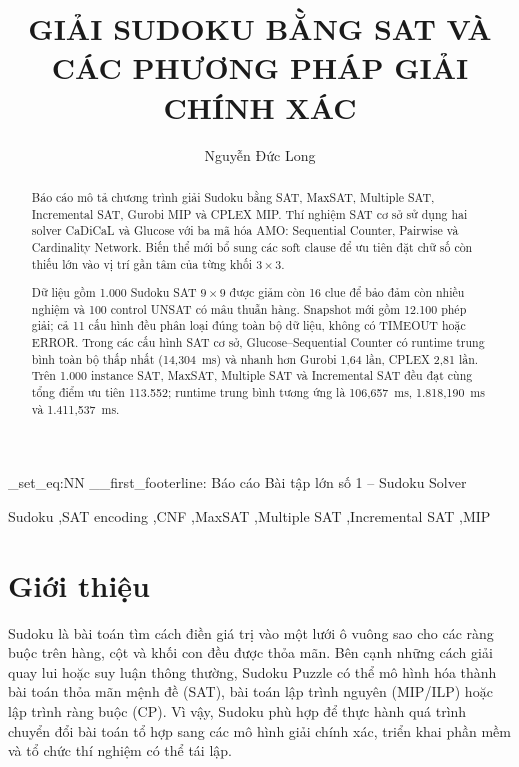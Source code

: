 \documentclass[a4paper,fleqn]{cas-sc}
\begin{document}
\newcommand{\reportfooter}{\small\sffamily Báo cáo Bài tập lớn số 1 -- Sudoku Solver}
\ExplSyntaxOn
\cs_set_eq:NN \__first_footerline: \reportfooter
\ExplSyntaxOff
\RenewDocumentCommand{\printorcid}{}{} %
\title[mode=title]{GIẢI SUDOKU BẰNG SAT VÀ CÁC PHƯƠNG PHÁP GIẢI CHÍNH XÁC}
\tnotemark[1]
\author[1]{Nguyễn Đức Long}
\address[1]{Lớp: INT3011E 4 \quad -- \quad Mã sinh viên: 24021555 }

\begin{abstract}
Báo cáo mô tả chương trình giải Sudoku bằng SAT, MaxSAT, Multiple SAT, Incremental SAT, Gurobi MIP và CPLEX MIP. Thí nghiệm SAT cơ sở sử dụng hai solver CaDiCaL và Glucose với ba mã hóa AMO: Sequential Counter, Pairwise và Cardinality Network. Biến thể mới bổ sung các soft clause để ưu tiên đặt chữ số còn thiếu lớn vào vị trí gần tâm của từng khối $3\times3$.

Dữ liệu gồm 1.000 Sudoku SAT $9\times9$ được giảm còn 16 clue để bảo đảm còn nhiều nghiệm và 100 control UNSAT có mâu thuẫn hàng. Snapshot mới gồm 12.100 phép giải; cả 11 cấu hình đều phân loại đúng toàn bộ dữ liệu, không có TIMEOUT hoặc ERROR. Trong các cấu hình SAT cơ sở, Glucose--Sequential Counter có runtime trung bình toàn bộ thấp nhất (14,304~ms) và nhanh hơn Gurobi 1,64 lần, CPLEX 2,81 lần. Trên 1.000 instance SAT, MaxSAT, Multiple SAT và Incremental SAT đều đạt cùng tổng điểm ưu tiên 113.552; runtime trung bình tương ứng là 106,657~ms, 1.818,190~ms và 1.411,537~ms.
\end{abstract}

\begin{keywords}
Sudoku \sep SAT encoding \sep CNF \sep MaxSAT \sep Multiple SAT \sep Incremental SAT \sep MIP
\end{keywords}

\maketitle

\section{Giới thiệu}\label{sec:introduction}
Sudoku là bài toán tìm cách điền giá trị vào một lưới ô vuông sao cho các ràng buộc trên hàng, cột và khối con đều được thỏa mãn. Bên cạnh những cách giải quay lui hoặc suy luận thông thường, Sudoku Puzzle có thể mô hình hóa thành bài toán thỏa mãn mệnh đề (SAT), bài toán lập trình nguyên (MIP/ILP) hoặc lập trình ràng buộc (CP). Vì vậy, Sudoku phù hợp để thực hành quá trình chuyển đổi bài toán tổ hợp sang các mô hình giải chính xác, triển khai phần mềm và tổ chức thí nghiệm có thể tái lập.
\end{document}
